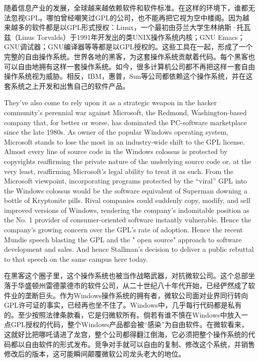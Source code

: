 \ifdefined\chs
随着信息产业的发展，全球越来越依赖软件和软件标准。在这样的环境下，谁都无法忽视GPL。哪怕曾经嘲笑过GPL的公司，也不能再把它视为空中楼阁。因为越来越多的软件都是以GPL形式授权：Linux，一个最初由芬兰大学生林纳斯·托瓦兹（Linus Torvalds）于1991年开发出的类UNIX操作系统内核；GNU Emacs；GNU调试器；GNU编译器等等都是以GPL授权的。这些工具在一起，形成了一个完整的自由操作系统。世界各地的黑客，为这套操作系统贡献着代码。每个黑客也可以自由地拥有这样一套操作系统。如今，很多计算机公司都不再把这样一套自由操作系统视为威胁。相反，IBM，惠普，Sun等公司都依赖这个操作系统，并在这套系统之上开发和出售自己的软件产品。
\fi

\ifdefined\eng
They've also come to rely upon it as a strategic weapon in the hacker community's perennial war against Microsoft, the Redmond, Washington-based company that, for better or worse, has dominated the PC-software marketplace since the late 1980s. As owner of the popular Windows operating system, Microsoft stands to lose the most in an industry-wide shift to the GPL license. Almost every line of source code in the Windows colossus is protected by copyrights reaffirming the private nature of the underlying source code or, at the very least, reaffirming Microsoft's legal ability to treat it as such. From the Microsoft viewpoint, incorporating programs protected by the ``viral'' GPL into the Windows colossus would be the software equivalent of Superman downing a bottle of Kryptonite pills. Rival companies could suddenly copy, modify, and sell improved versions of Windows, rendering the company's indomitable position as the No. 1 provider of consumer-oriented software instantly vulnerable. Hence the company's growing concern over the GPL's rate of adoption. Hence the recent Mundie speech blasting the GPL and the " open source" approach to software development and sales. And hence Stallman's decision to deliver a public rebuttal to that speech on the same campus here today.
\fi

\ifdefined\chs
在黑客这个圈子里，这个操作系统也被当作战略武器，对抗微软公司。这个总部坐落于华盛顿州雷德蒙德市的软件公司，从二十世纪八十年代开始，已经俨然成了软件业的垄断巨头。作为Windows操作系统的拥有者，微软公司面对业界同行转向GPL许可证的事实，已经再也坐不住了。Windows中，几乎每行代码都是私有的。至少按照法律条款看，它是归微软所有。倘若有谁不慎在Windows中放入一点GPL授权的代码，整个Windows产品都会被``感染''为自由软件。在微软看来，这就好比把哪吒请进了龙宫，整个公司都得翻江倒海，它必须把整个操作系统的代码都以自由软件的形式发布。竞争对手就可以自由的复制、修改这个系统，并销售修改后的版本，这可能瞬间颠覆微软公司龙头老大的地位。
\fi

